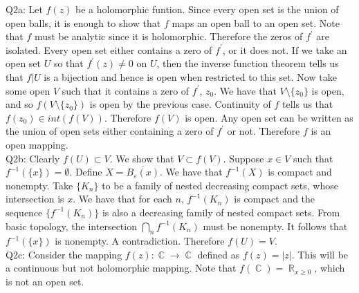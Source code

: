 \documentclass[letterpaper]{article}
\DeclareMathOperator{\R}{\mathbb{R}}
\DeclareMathOperator{\C}{\mathbb{C}}
\newcommand{\ol}{\overline}
\begin{document}
\noindent Q2a: Let $f(z)$ be a holomorphic funtion. Since every open set is the union of open balls, it is enough to show that $f$ maps an open ball to an open set. 
Note that $f$ must be analytic since it is holomorphic. Therefore the zeros of $f^\prime$ are isolated. Every open set either contains a zero of $f^\prime$, or it does not. 
If we take an open set $U$ so that $f^\prime(z) \neq 0 $ on $U$, then the inverse function theorem tells us that $f|U$ is a bijection and hence is open when restricted to this set. 
Now take some open $V$ such that it contains a zero of $f^\prime$, $z_0$. We have that $V \setminus \{z_0\}$ is open, and so $f(V\setminus\{z_0\})$ is open by the previous case.
Continuity of $f$ tells us that $f(z_0) \in int(f(V)).$ Therefore $f(V)$ is open. Any open set can be written as the union of open sets either containing a zero of $f^\prime$ or not.
Therefore $f$ is an open mapping. 
\newline \\ Q2b: Clearly $f(U)\subset V$. We show that $V \subset f(V)$. Suppose $x\in V$ such that $f^{-1}(\{x\})= \emptyset$. Define $X = \ol{B_\varepsilon(x)} $.
We have that $f^{-1}(X)$ is compact and nonempty. Take $\{K_n\}$ to be a family of nested decreasing compact sets, whose intersection is $x$. 
We have that for each $n$, $f^{-1}(K_n)$ is compact and the sequence $\{f^{-1}(K_n)\}$ is also a decreasing family of nested compact sets.
From basic topology, the intersection $\bigcap_{n}f^{-1}(K_n)$ must be nonempty. It follows that $f^{-1}(\{x\})$ is nonempty. A contradiction. Therefore $f(U)=V$. 
\newline \\ Q2c: Consider the mapping $f(z): \C \to \C$ defined as $f(z) = |z|$. This will be a continuous but not holomorphic mapping. Note that $f(\C) = \R_{x\geq 0}$, which is not an open set.  
\end{document}
